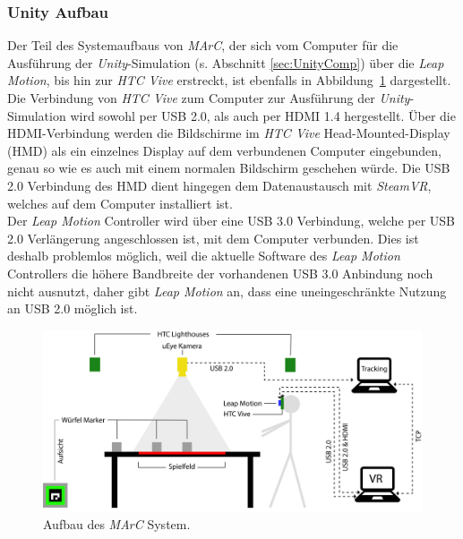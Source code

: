 \subsubsection{Unity Aufbau}
Der Teil des Systemaufbaus von \emph{MArC}, der sich vom Computer für die Ausführung der \emph{Unity}-Simulation (s. Abschnitt \ref{sec:UnityComp}) über die \emph{Leap Motion}, bis hin zur \emph{HTC Vive} erstreckt, ist ebenfalls in Abbildung~\ref{fig:AufbauMarc} dargestellt.\\
Die Verbindung von \emph{HTC Vive} zum Computer zur Ausführung der \emph{Unity}-Simulation wird sowohl per USB 2.0, als auch per HDMI 1.4 hergestellt. Über die HDMI-Verbindung werden die Bildschirme im \emph{HTC Vive} Head-Mounted-Display (HMD) als ein einzelnes Display auf dem verbundenen Computer eingebunden, genau so wie es auch mit einem normalen Bildschirm geschehen würde. Die USB 2.0 Verbindung des HMD dient hingegen dem Datenaustausch mit \emph{SteamVR}, welches auf dem Computer installiert ist.\\
Der \emph{Leap Motion} Controller wird über eine USB 3.0 Verbindung, welche per USB 2.0 Verlängerung angeschlossen ist, mit dem Computer verbunden. Dies ist deshalb problemlos möglich, weil die aktuelle Software des \emph{Leap Motion} Controllers die höhere Bandbreite der vorhandenen USB 3.0 Anbindung noch nicht ausnutzt, daher gibt \emph{Leap Motion} an, dass eine uneingeschränkte Nutzung an USB 2.0 möglich ist.~\cite{website:LeapMotionSupportQuestion}

\begin{figure}[H]
	\centering
	\includegraphics[width=\textwidth]{Bilder/Aufbau_MArC.jpg}
	\caption{Aufbau des \textit{MArC} System.}
	\label{fig:AufbauMarc}
\end{figure}

